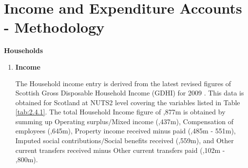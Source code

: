 \pagebreak

\pagebreak


\newpage
\section{Income and Expenditure Accounts - Methodology}
\label{sec:2.5}

\bigskip
\begin{center}
\textbf{\LARGE Households}
\end{center}

\begin{enumerate}


\item \textbf {Income}

\bigskip

The Household income entry is derived from the latest revised figures of Scottish Gross Disposable Household Income (GDHI) for 2009 \cite{ONS2013a}. This data is obtained for Scotland at NUTS2 level covering the variables listed in Table \ref{tab:2.4.1}. The total Household Income figure of ,877m is obtained by summing up Operating surplus$/$Mixed income (,437m), Compensation of employees (,645m), Property income received minus paid (,485m - \textsterling551m), Imputed social contributions$/$Social benefits received (,559m), and Other current transfers received minus Other current transfers paid (,102m - ,800m).    

\bigskip


\end{enumerate}
